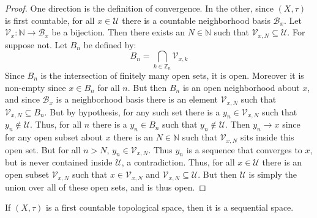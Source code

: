 \documentclass{article}                                                        %
\begin{document}
        \begin{proof}
            One direction is the definition of convergence. In the other, since
            $(X,\tau)$ is first countable, for all $x\in\mathcal{U}$ there is a
            countable neighborhood basis $\mathcal{B}_{x}$. Let
            $\mathcal{V}_{x}:\mathbb{N}\rightarrow\mathcal{B}_{x}$ be a
            bijection. Then there exists an $N\in\mathbb{N}$ such that
            $\mathcal{V}_{x,N}\subseteq\mathcal{U}$. For suppose not. Let
            $B_{n}$ be defined by:
            \begin{equation}
                B_{n}=\bigcap_{k\in\mathbb{Z}_{n}}\mathcal{V}_{x,k}
            \end{equation}
            Since $B_{n}$ is the intersection of finitely many open sets, it is
            open. Moreover it is non-empty since $x\in{B}_{n}$ for all $n$.
            But then $B_{n}$ is an open neighborhood about $x$, and since
            $\mathcal{B}_{x}$ is a neighborhood basis there is an element
            $\mathcal{V}_{x,N}$ such that $\mathcal{V}_{x,N}\subseteq{B}_{n}$.
            But by hypothesis, for any such set there is a
            $y_{n}\in\mathcal{V}_{x,N}$ such that $y_{n}\notin\mathcal{U}$.
            Thus, for all $n$ there is a $y_{n}\in{B}_{n}$ such that
            $y_{n}\notin\mathcal{U}$. Then $y_{n}\rightarrow{x}$ since for any
            open subset about $x$ there is an $N\in\mathbb{N}$ such that
            $\mathcal{V}_{x,N}$ sits inside this open set. But for all $n>N$,
            $y_{n}\in\mathcal{V}_{x,N}$. Thus $y_{n}$ is a sequence that
            converges to $x$, but is never contained inside $\mathcal{U}$,
            a contradiction. Thus, for all $x\in\mathcal{U}$ there is an open
            subset $\mathcal{V}_{x,N}$ such that $x\in\mathcal{V}_{x,N}$ and
            $\mathcal{V}_{x,N}\subseteq\mathcal{U}$. But then $\mathcal{U}$ is
            simply the union over all of these open sets, and is thus open.
        \end{proof}
        \begin{theorem}
            If $(X,\tau)$ is a first countable topological space, then it is
            a sequential space.
        \end{theorem}
\end{document}
